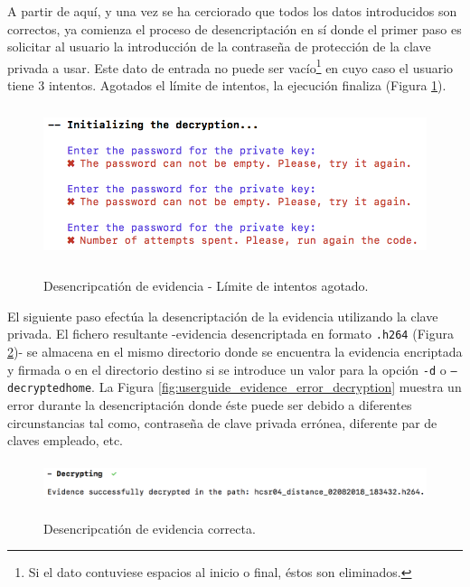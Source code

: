 \documentclass[12pt,a4paper, twoside]{report}
\begin{document}
	A partir de aquí, y una vez se ha cerciorado que todos los datos introducidos son correctos, ya comienza el proceso de desencriptación en sí donde el primer paso es solicitar al usuario la introducción de la contraseña de protección de la clave privada a usar. Este dato de entrada no puede ser vacío\footnote{Si el dato contuviese espacios al inicio o final, éstos son eliminados.} en cuyo caso el usuario tiene 3 intentos. Agotados el límite de intentos, la ejecución finaliza (Figura \ref{fig:userguide_evidence_attempts}). \\

		\begin{figure}[!ht]   
			\caption{Desencripcatión de evidencia - Límite de intentos agotado.} 
			\begin{center} 					\includegraphics[width=14cm,height=4.5cm]{Images/userGuide/evidence/attempts} \\
				\label{fig:userguide_evidence_attempts} 
			\end{center}  
		\end{figure}
	
	El siguiente paso efectúa la desencriptación de la evidencia utilizando la clave privada. El fichero resultante -evidencia desencriptada en formato \texttt{.h264} (Figura \ref{fig:userguide_evidence_decryption})- se almacena en el mismo directorio donde se encuentra la evidencia encriptada y firmada o en el directorio destino si se introduce un valor para la opción \texttt{-d} o \texttt{--decryptedhome}. La Figura \ref{fig:userguide_evidence_error_decryption} muestra un error durante la desencriptación donde éste puede ser debido a diferentes circunstancias tal como, contraseña de clave privada errónea, diferente par de claves empleado, etc.

	\newpage
	
		\begin{figure}[!ht]   
			\caption{Desencripcatión de evidencia correcta.} 
			\begin{center} 					\includegraphics[width=12cm,height=1.2cm]{Images/userGuide/evidence/decryption} \\
				\label{fig:userguide_evidence_decryption} 
			\end{center}  
		\end{figure}
	
\end{document}
